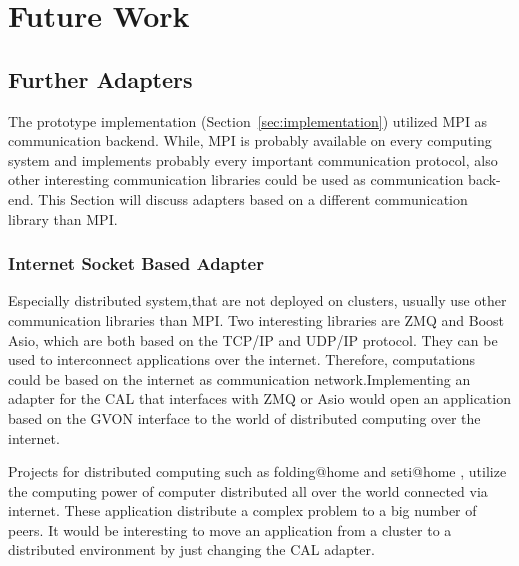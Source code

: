 \chapter{Future Work}
\label{sec:futurework}



\section*{Further Adapters}

The prototype implementation (Section~\ref{sec:implementation})
utilized MPI as communication backend. While, MPI is probably
available on every computing system and implements probably every
important communication protocol, also other interesting communication
libraries could be used as communication back-end.  This Section will
discuss adapters based on a different communication library than MPI.

\subsection*{Internet Socket Based Adapter}

Especially distributed system,that are not deployed on clusters,
usually use other communication libraries than MPI. Two
interesting libraries are ZMQ and Boost Asio, which are both based
on the TCP/IP and UDP/IP protocol. They can be used to
interconnect applications over the internet. Therefore,
computations could be based on the internet as communication
network.Implementing an adapter for the CAL that interfaces with
ZMQ or Asio would open an application based on the GVON interface
to the world of distributed computing over the internet.

Projects for distributed computing such as folding@home
\cite{ref:folding_at_home} and seti@home \cite{ref:seti_at_home},
utilize the computing power of computer distributed all over the
world connected via internet.  These application distribute a
complex problem to a big number of peers. It would be interesting
to move an application from a cluster to a distributed environment
by just changing the CAL adapter.

